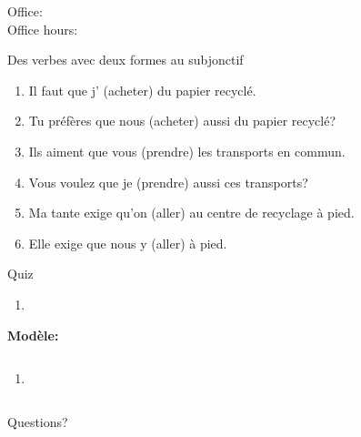 \documentclass{beamer}
\subtitle[Subjonctif]{Surprise! C'est encore le subjonctif.}
\begin{document}
  \begin{frame}
    \titlepage
    \tiny{Office: \\
          Office hours: }
  \end{frame}

  \begin{frame}{Des verbes avec deux formes au subjonctif}
    \begin{enumerate}
      \item Il faut que j'\underline{} (acheter) du papier recyclé.
      \item Tu préfères que nous \underline{} (acheter) aussi du papier recyclé?
      \item Ils aiment que vous \underline{} (prendre) les transports en commun.
      \item Vous voulez que je \underline{} (prendre) aussi ces transports?
      \item Ma tante exige qu'on \underline{} (aller) au centre de recyclage à pied.
      \item Elle exige que nous y \underline{} (aller) à pied.
    \end{enumerate}
  \end{frame}

  \begin{frame}{}
    \begin{center}
      \Large Quiz
    \end{center}
  \end{frame}

  \begin{frame}{}
    
    \begin{enumerate}
      \item 
    \end{enumerate}
  \end{frame}

  \begin{frame}{}
    
    \begin{description}
      \item[] \textbf{Modèle:} \emph{}
      \item 
      \item[OU] 
    \end{description}
    \begin{columns}
        \begin{enumerate}
          \item 
        \end{enumerate}
    \end{columns}
  \end{frame}

  \begin{frame}{}
    \begin{center}
      \Large Questions?
    \end{center}
  \end{frame}
\end{document}
